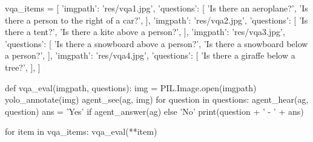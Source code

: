 \begin{cell}
vqa_items = [
    {'imgpath': 'res/vqa1.jpg', 'questions': [
        'Is there an aeroplane?',
        'Is there a person to the right of a car?',
    ]},
    {'imgpath': 'res/vqa2.jpg', 'questions': [
        'Is there a tent?',
        'Is there a kite above a person?',
    ]},
    {'imgpath': 'res/vqa3.jpg', 'questions': [
        'Is there a snowboard above a person?',
        'Is there a snowboard below a person?',
    ]},
    {'imgpath': 'res/vqa4.jpg', 'questions': [
        'Is there a giraffe below a tree?',
    ]},
]

def vqa_eval(imgpath, questions):
    img = PIL.Image.open(imgpath)
    yolo_annotate(img)
    agent_see(ag, img)
    for question in questions:
        agent_hear(ag, question)
        ans = 'Yes' if agent_answer(ag) else 'No'
        print(question + ' - ' + ans)

for item in vqa_items:
    vqa_eval(**item)
\end{cell}

